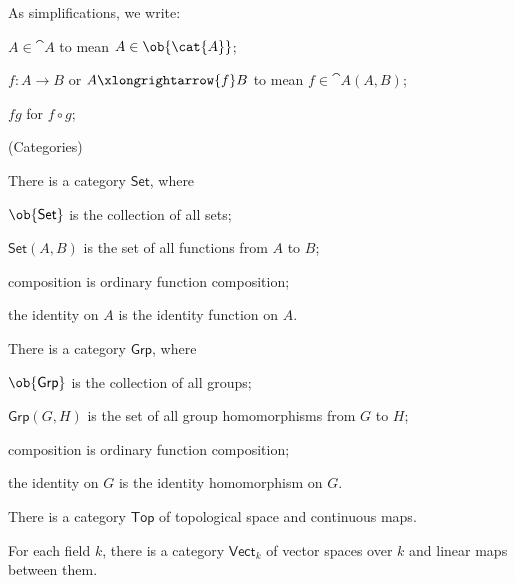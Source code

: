 \begin{remark}
  As simplifications, we write:
  \begin{enumalph}
    \item $A \in \cat{A}$ to mean $A \in \ob{\cat{A}}$;
    \item $f : A \to B$ or $A \xlongrightarrow{f} B$ to mean
      $f \in \cat{A}(A,B)$;
    \item $fg$ for $f \circ g$;
  \end{enumalph}
\end{remark}

\step
\begin{examples} (Categories)
  \begin{enumarabic}
    \item There is a category $\mathsf{Set}$, where
      \begin{enumalph}
        \item $\ob{\mathsf{Set}}$ is the collection of all sets;
        \item $\mathsf{Set}(A,B)$ is the set of all functions from $A$ to $B$;
        \item composition is ordinary function composition;
        \item the identity on $A$ is the identity function on $A$.
      \end{enumalph}
    \item There is a category $\mathsf{Grp}$, where
      \begin{enumalph}
        \item $\ob{\mathsf{Grp}}$ is the collection of all groups;
        \item $\mathsf{Grp}(G,H)$ is the set of all group homomorphisms from $G$ to $H$;
        \item composition is ordinary function composition;
        \item the identity on $G$ is the identity homomorphism on $G$.
      \end{enumalph}
    \item There is a category $\mathsf{Top}$ of topological space and continuous maps.
    \item For each field $k$, there is a category $\mathsf{Vect}_k$ of vector spaces over $k$
      and linear maps between them.
  \end{enumarabic}
\end{examples}

